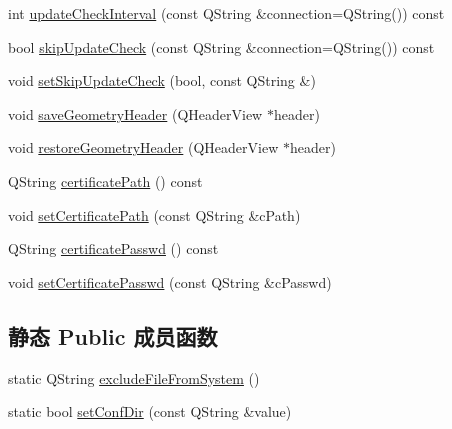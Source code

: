 \begin{DoxyCompactItemize}
\item 
int \hyperlink{class_o_c_c_1_1_config_file_a79f34a30c08064553a51800be2f61a2b}{update\+Check\+Interval} (const Q\+String \&connection=Q\+String()) const
\item 
bool \hyperlink{class_o_c_c_1_1_config_file_a165eec00336677288fcc0404a16d9d25}{skip\+Update\+Check} (const Q\+String \&connection=Q\+String()) const
\item 
void \hyperlink{class_o_c_c_1_1_config_file_afa2f591112905b759f48a11a20cea0c6}{set\+Skip\+Update\+Check} (bool, const Q\+String \&)
\item 
void \hyperlink{class_o_c_c_1_1_config_file_aab60cd329aec85749b0a499a332e7a0a}{save\+Geometry\+Header} (Q\+Header\+View $\ast$header)
\item 
void \hyperlink{class_o_c_c_1_1_config_file_aa9e866883f8414b98e777abe581674f4}{restore\+Geometry\+Header} (Q\+Header\+View $\ast$header)
\item 
Q\+String \hyperlink{class_o_c_c_1_1_config_file_a0ee4e4eb052bc33073704aa3b1f56b3c}{certificate\+Path} () const
\item 
void \hyperlink{class_o_c_c_1_1_config_file_ac4924de88edf7c59d48f1168d7a1ef16}{set\+Certificate\+Path} (const Q\+String \&c\+Path)
\item 
Q\+String \hyperlink{class_o_c_c_1_1_config_file_aa86c9825fc9a40f149762c6181b31557}{certificate\+Passwd} () const
\item 
void \hyperlink{class_o_c_c_1_1_config_file_add2b35215f9c6953fdf0751f2d328b49}{set\+Certificate\+Passwd} (const Q\+String \&c\+Passwd)
\end{DoxyCompactItemize}
\subsection*{静态 Public 成员函数}
\begin{DoxyCompactItemize}
\item 
static Q\+String \hyperlink{class_o_c_c_1_1_config_file_a37807874bbe3793ad448db5ec4ba212d}{exclude\+File\+From\+System} ()
\item 
static bool \hyperlink{class_o_c_c_1_1_config_file_a082513579908483abcffecae0a143c88}{set\+Conf\+Dir} (const Q\+String \&value)
\end{DoxyCompactItemize}
